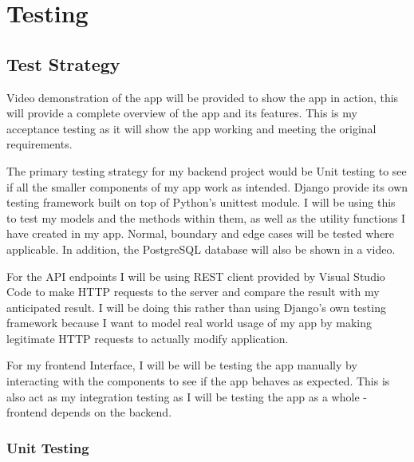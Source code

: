 \chapter{Testing}

\section{Test Strategy}
Video demonstration of the app will be provided to show the app in action, this will provide a complete overview of the app and its features. This is my acceptance testing as it will show the app working and meeting the original requirements.

The primary testing strategy for my backend project would be Unit testing to see if all the smaller components of my app work as intended. Django provide its own testing framework built on top of Python's unittest module. I will be using this to test my models and the methods within them, as well as the utility functions I have created in my app. Normal, boundary and edge cases will be tested where applicable. In addition, the PostgreSQL database will also be shown in a video.

For the API endpoints I will be using REST client provided by Visual Studio Code to make HTTP requests to the server and compare the result with my anticipated result. I will be doing this rather than using Django's own testing framework because I want to model real world usage of my app by making legitimate HTTP requests to actually modify application.

For my frontend Interface, I will be will be testing the app manually by interacting with the components to see if the app behaves as expected. This is also act as my integration testing as I will be testing the app as a whole - frontend depends on the backend.

\subsection{Unit Testing}
